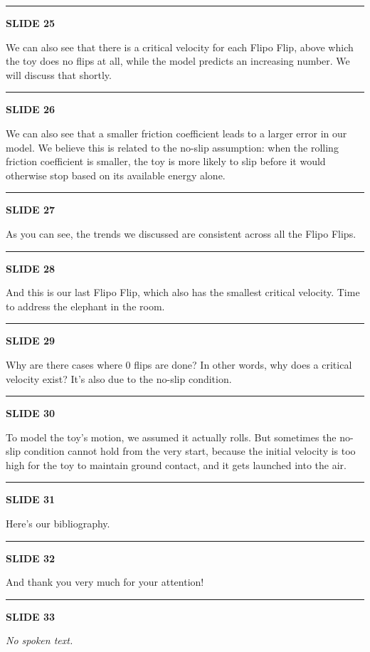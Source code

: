 \documentclass[a4paper,11pt]{article}
\newcommand{\slidetitle}[1]{{\small\textbf{SLIDE #1}}\par\smallskip}
\newcommand{\slidedivider}{\vspace{0.7em}\noindent\rule{\textwidth}{0.4pt}\vspace{0.7em}}
\begin{document}
\slidedivider

\slidetitle{25}
We can also see that there is a critical velocity for each Flipo Flip, above which the toy does no flips at all, while the model predicts an increasing number. We will discuss that shortly.

\slidedivider

\slidetitle{26}
We can also see that a smaller friction coefficient leads to a larger error in our model. We believe this is related to the no-slip assumption: when the rolling friction coefficient is smaller, the toy is more likely to slip before it would otherwise stop based on its available energy alone.

\slidedivider

\slidetitle{27}
As you can see, the trends we discussed are consistent across all the Flipo Flips.

\slidedivider

\slidetitle{28}
And this is our last Flipo Flip, which also has the smallest critical velocity. Time to address the elephant in the room.

\slidedivider

\slidetitle{29}
Why are there cases where 0 flips are done? In other words, why does a critical velocity exist? It's also due to the no-slip condition.

\slidedivider

\slidetitle{30}
To model the toy's motion, we assumed it actually rolls. But sometimes the no-slip condition cannot hold from the very start, because the initial velocity is too high for the toy to maintain ground contact, and it gets launched into the air.

\slidedivider

\slidetitle{31}
Here's our bibliography.

\slidedivider

\slidetitle{32}
And thank you very much for your attention!

\slidedivider

\slidetitle{33}
\textit{No spoken text.}
\end{document}
